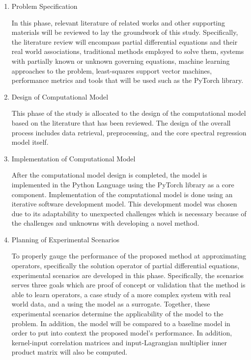 \begin{enumerate}
      \item Problem Specification

            In this phase, relevant literature of related works and other supporting materials will be reviewed to lay the groundwork of this study. Specifically, the literature review will encompass partial differential equations and their real world associations, traditional methods employed to solve them, systems with partially known or unknown governing equations, machine learning approaches to the problem, least-squares support vector machines, performance metrics and tools that will be used such as the PyTorch library.

      \item Design of Computational Model

            This phase of the study is allocated to the design of the computational model based on the literature that has been reviewed. The design of the overall process includes data retrieval, preprocessing, and the core spectral regression model itself.

      \item Implementation of Computational Model

            After the computational model design is completed, the model is implemented in the Python Language using the PyTorch library as a core component. Implementation of the computational model is done using an iterative software development model. This development model was chosen due to its adaptability to unexpected challenges which is necessary because of the challenges and unknowns with developing a novel method.

      \item Planning of Experimental Scenarios

            To properly gauge the performance of the proposed method at approximating operators, specifically the solution operator of partial differential equations, experimental scenarios are developed in this phase. Specifically, the scenarios serves three goals which are proof of concept or validation that the method is able to learn operators, a case study of a more complex system with real world data, and a using the model as a surrogate. Together, these experimental scenarios determine the applicability of the model to the problem. In addition, the model will be compared to a baseline model in order to put into context the proposed model's performance. In addition, kernel-input correlation matrices and input-Lagrangian multiplier inner product matrix will also be computed.


\end{enumerate}
